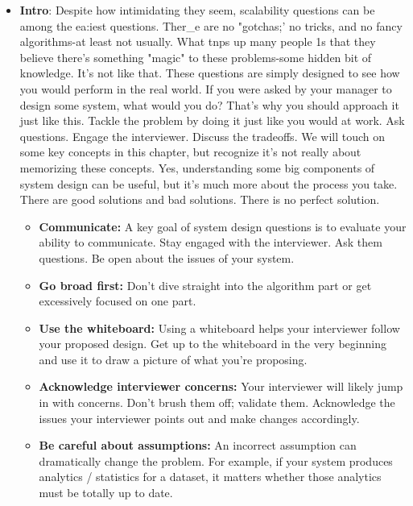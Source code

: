 \documentclass{report}
\begin{document}
\begin{itemize}
    \end{itemize}


    \pagebreak 
    \begin{itemize}
        \item \textbf{Intro}: Despite how intimidating they seem, scalability questions can be among the ea:iest questions. Ther_e are no "gotchas;' no tricks, and no fancy algorithms-at least not usually. What tnps up many people 1s that they believe there's something "magic" to these problems-some hidden bit of knowledge.
            \bigbreak \noindent 
            It's not like that. These questions are simply designed to see how you would perform in the real world. If you were asked by your manager to design some system, what would you do?
            \bigbreak \noindent 
            That's why you should approach it just like this. Tackle the problem by doing it just like you would at work. Ask questions. Engage the interviewer. Discuss the tradeoffs.
            \bigbreak \noindent 
            We will touch on some key concepts in this chapter, but recognize it's not really about memorizing these concepts. Yes, understanding some big components of system design can be useful, but it's much more about the process you take. There are good solutions and bad solutions. There is no perfect solution. 
            \begin{itemize}
                \item \textbf{Communicate:} A key goal of system design questions is to evaluate your ability to communicate. Stay engaged with the interviewer. Ask them questions. Be open about the issues of your system.
                \item \textbf{Go broad first:} Don't dive straight into the algorithm part or get excessively focused on one part. 
                \item \textbf{Use the whiteboard:} Using a whiteboard helps your interviewer follow your proposed design. Get up to the whiteboard in the very beginning and use it to draw a picture of what you're proposing. 
                \item \textbf{Acknowledge interviewer concerns:} Your interviewer will likely jump in with concerns. Don't brush them off; validate them. Acknowledge the issues your interviewer points out and make changes accordingly.
                \item \textbf{Be careful about assumptions:} An incorrect assumption can dramatically change the problem. For example, if your system produces analytics / statistics for a dataset, it matters whether those analytics must be totally up to date.

\end{itemize}
\end{itemize}
\end{document}
